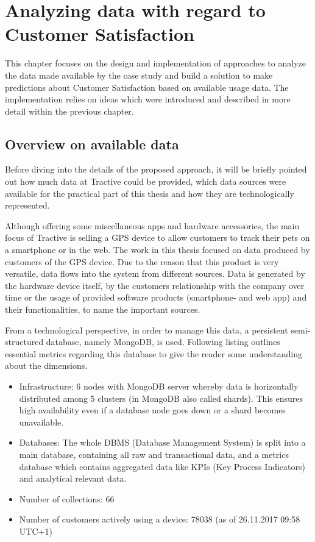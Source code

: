 \chapter{Analyzing  data with regard to Customer Satisfaction}
\label{ch:implementation}

This chapter focuses on the design and implementation of approaches to analyze the data made available by the case study and build a solution to make predictions about Customer Satisfaction based on available usage data. The implementation relies on ideas which were introduced and described in more detail within the previous chapter. 

\section{Overview on available data}
Before diving into the details of the proposed approach, it will be briefly pointed out how much data at Tractive could be provided, which data sources were available for the practical part of this thesis and how they are technologically represented. 

Although offering some miscellaneous apps and hardware accessories, the main focus of Tractive is selling a GPS device to allow customers to track their pets on a smartphone or in the web. The work in this thesis focused on data produced by customers of the GPS device. Due to the reason that this product is very versatile, data flows into the system from different sources. Data is generated by the hardware device itself, by the customers relationship with the company over time or the usage of provided software products (smartphone- and web app) and their functionalities, to name the important sources.

From a technological perspective, in order to manage this data, a persistent semi-structured database, namely MongoDB, is used. Following listing outlines essential metrics regarding this database to give the reader some understanding about the dimensions.

\begin{itemize}
	\item Infrastructure: 6 nodes with MongoDB server whereby data is horizontally distributed among 5 clusters (in MongoDB also called shards). This ensures high availability even if a database node goes down or a shard becomes unavailable.
	\item Databases: The whole DBMS (Database Management System) is split into a main database, containing all raw and transactional data, and a metrics database which contains aggregated data like KPIs (Key Process Indicators) and analytical relevant data. 
	\item Number of collections: 66
	\item Number of customers actively using a device: 78038 (as of 26.11.2017 09:58 UTC+1)
\end{itemize}

